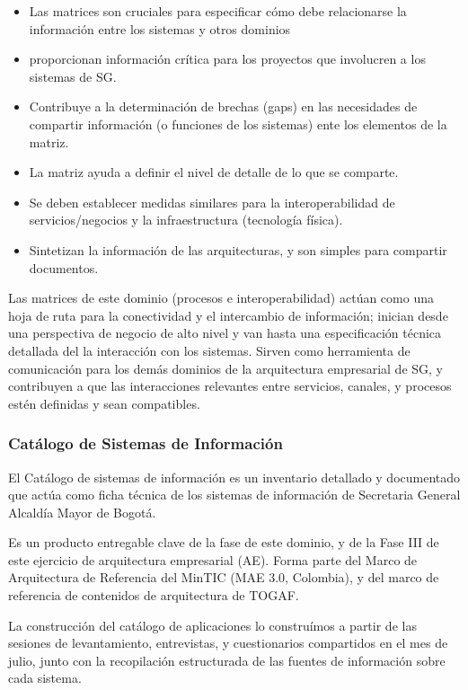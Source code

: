 \documentclass[
	a4paper, %
	12pt, %
]{include/CSSullivanBusinessReport}
\def\tightlist{}
\begin{document}
\begin{itemize}
\tightlist
\item
  Las matrices son cruciales para especificar cómo debe relacionarse la
  información entre los sistemas y otros dominios
\item
  proporcionan información crítica para los proyectos que involucren a
  los sistemas de SG.
\item
  Contribuye a la determinación de brechas (gaps) en las necesidades de
  compartir información (o funciones de los sistemas) ente los elementos
  de la matriz.
\item
  La matriz ayuda a definir el nivel de detalle de lo que se comparte.
\item
  Se deben establecer medidas similares para la interoperabilidad de
  servicios/negocios y la infraestructura (tecnología física).
\item
  Sintetizan la información de las arquitecturas, y son simples para
  compartir documentos.
\end{itemize}

Las matrices de este dominio (procesos e interoperabilidad) actúan como
una hoja de ruta para la conectividad y el intercambio de información;
inician desde una perspectiva de negocio de alto nivel y van hasta una
especificación técnica detallada del la interacción con los sistemas.
Sirven como herramienta de comunicación para los demás dominios de la
arquitectura empresarial de SG, y contribuyen a que las interacciones
relevantes entre servicios, canales, y procesos estén definidas y sean
compatibles.

\subsubsection{Catálogo de Sistemas de
Información}\label{sec:catuxe1logo-de-sistemas-de-informaciuxf3n}

El Catálogo de sistemas de información es un inventario detallado y
documentado que actúa como ficha técnica de los sistemas de información
de Secretaria General Alcaldía Mayor de Bogotá.

Es un producto entregable clave de la fase de este dominio, y de la Fase
III de este ejercicio de arquitectura empresarial (AE). Forma parte del
Marco de Arquitectura de Referencia del MinTIC (MAE 3.0, Colombia), y
del marco de referencia de contenidos de arquitectura de TOGAF.

La construcción del catálogo de aplicaciones lo construímos a partir de
las sesiones de levantamiento, entrevistas, y cuestionarios compartidos
en el mes de julio, junto con la recopilación estructurada de las
fuentes de información sobre cada sistema.
\end{document}
